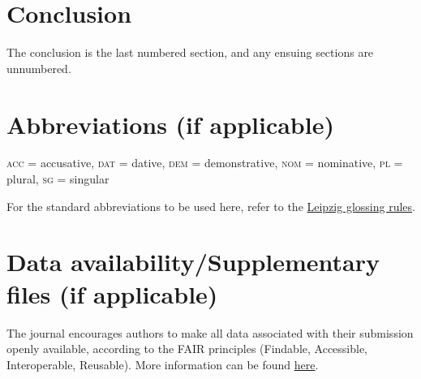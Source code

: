 \documentclass[times,linguex,xcolor]{glossa}
\begin{document}
\section{Conclusion \label{sec:5_conclusion}}

The conclusion is the last numbered section, and any ensuing sections are unnumbered.

\pagebreak
\section*{Abbreviations (if applicable)}\label{abbrev}

\textsc{acc} = accusative, \textsc{dat} = dative, \textsc{dem} = demonstrative, \textsc{nom} = nominative, \textsc{pl} = plural, \textsc{sg} = singular

For the standard abbreviations to be used here, refer to the \href{https://www.eva.mpg.de/lingua/resources/glossing-rules.php}{Leipzig glossing rules}.

\section*{Data availability/Supplementary files (if applicable)}

The journal encourages authors to make all data associated with their submission openly available, according to the FAIR principles (Findable, Accessible, Interoperable, Reusable). More information can be found \href{https://www.glossa-journal.org/site/editorial-policies/#data-policy}{here}.
\end{document}
